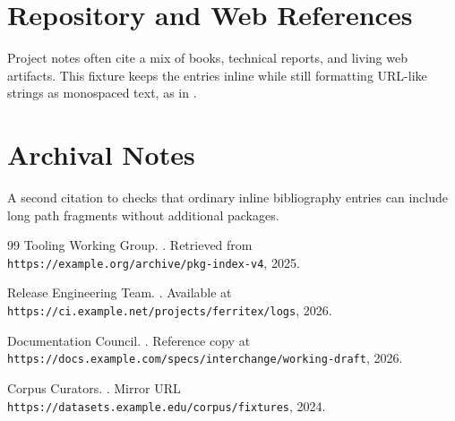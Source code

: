 \documentclass{article}
\begin{document}
\section{Repository and Web References}
Project notes often cite a mix of books, technical reports, and living web
artifacts. This fixture keeps the entries inline while still formatting URL-like
strings as monospaced text, as in \cite{pkgindex,buildlog}.

\section{Archival Notes}
A second citation to \cite{specdraft} checks that ordinary inline bibliography
entries can include long path fragments without additional packages.

\begin{thebibliography}{99}
Tooling Working Group.
.
\newblock Retrieved from \texttt{https://example.org/archive/pkg-index-v4}, 2025.

Release Engineering Team.
.
\newblock Available at \texttt{https://ci.example.net/projects/ferritex/logs}, 2026.

Documentation Council.
.
\newblock Reference copy at
\texttt{https://docs.example.com/specs/interchange/working-draft}, 2026.

Corpus Curators.
.
\newblock Mirror URL \texttt{https://datasets.example.edu/corpus/fixtures}, 2024.
\end{thebibliography}
\end{document}
